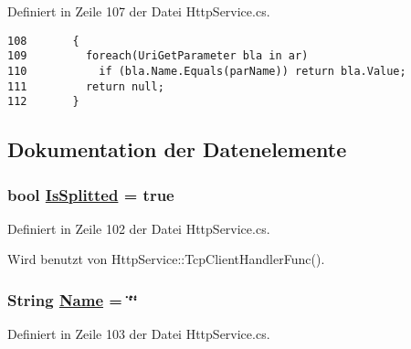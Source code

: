 Definiert in Zeile 107 der Datei Http\-Service.cs.



\footnotesize\begin{verbatim}108       {
109         foreach(UriGetParameter bla in ar)
110           if (bla.Name.Equals(parName)) return bla.Value;
111         return null;
112       }
\end{verbatim}\normalsize 


\subsection{Dokumentation der Datenelemente}
\hypertarget{classQbeSAS_1_1HttpService_1_1UriGetParameter_QbeSAS_1_1HttpService_1_1UriGetParametero0}{
\subsubsection[IsSplitted]{\setlength{\rightskip}{0pt plus 5cm}bool \hyperlink{classQbeSAS_1_1HttpService_1_1UriGetParameter_QbeSAS_1_1HttpService_1_1UriGetParametero0}{Is\-Splitted} = true}}
\label{classQbeSAS_1_1HttpService_1_1UriGetParameter_QbeSAS_1_1HttpService_1_1UriGetParametero0}




Definiert in Zeile 102 der Datei Http\-Service.cs.

Wird benutzt von Http\-Service::Tcp\-Client\-Handler\-Func().\hypertarget{classQbeSAS_1_1HttpService_1_1UriGetParameter_QbeSAS_1_1HttpService_1_1UriGetParametero1}{
\subsubsection[Name]{\setlength{\rightskip}{0pt plus 5cm}String \hyperlink{classQbeSAS_1_1HttpService_1_1UriGetParameter_QbeSAS_1_1HttpService_1_1UriGetParametero1}{Name} = \char`\"{}\char`\"{}}}
\label{classQbeSAS_1_1HttpService_1_1UriGetParameter_QbeSAS_1_1HttpService_1_1UriGetParametero1}




Definiert in Zeile 103 der Datei Http\-Service.cs.

